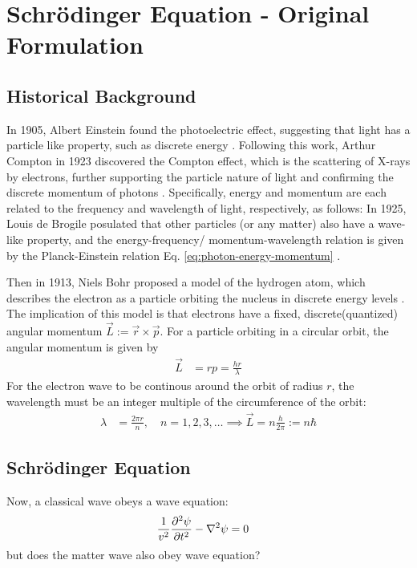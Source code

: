\newpage
\section{Schrödinger Equation - Original Formulation}
\subsection{Historical Background}
In 1905, Albert Einstein found the photoelectric effect, suggesting that light has a particle like property, such as discrete energy
\cite{1905-photoelectric}.
Following this work, Arthur Compton in 1923 discovered the Compton effect, which is the scattering of X-rays by electrons, further supporting the particle nature of light and confirming the discrete momentum of photons
\cite{1923-compton}.
Specifically, energy and momentum are each related to the frequency and wavelength of light, respectively, as follows:
In 1925, Louis de Brogile posulated that other particles (or any matter) also have a wave-like property, and the energy-frequency/ momentum-wavelength relation is given by the Planck-Einstein relation Eq. \eqref{eq:photon-energy-momentum} \cite{1925-deBroglie}.

Then in 1913, Niels Bohr proposed a model of the hydrogen atom, which describes the electron as a particle orbiting the nucleus in discrete energy levels \cite{1913-bohr}.
The implication of this model is that electrons have a fixed, discrete(quantized) angular momentum $\vec{L} := \vec{r} \times \vec{p}$.
For a particle orbiting in a circular orbit, the angular momentum is given by
\begin{align}
  \vec{L} & = r p = \frac{h r}{\lambda}
\end{align}
For the electron wave to be continous around the orbit of radius $r$, the wavelength must be an integer multiple of the circumference of the orbit:
\begin{align}
  \lambda & = \frac{2 \pi r}{n}, \quad n = 1, 2, 3, \ldots \implies \vec{L} = n \frac{h}{2 \pi} := n \hbar
\end{align}

\subsection{Schrödinger Equation}
Now, a classical wave obeys a wave equation:
\begin{align}
  \frac{1}{v^2} \pdv[2]{\psi}{t} - \nabla^2 \psi & = 0
\end{align}
but does the matter wave also obey wave equation?

